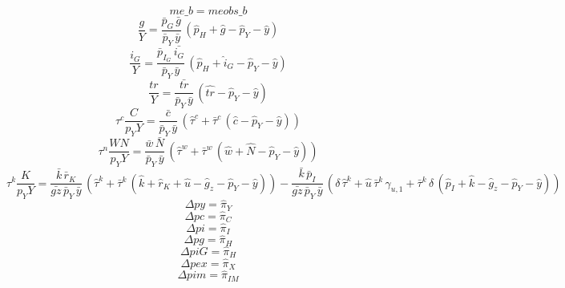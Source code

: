 \begin{dmath}
{me\_b}={meobs\_b}
\end{dmath}
\begin{dmath}
{\frac{g}{Y}}=\frac{{\bar{p}_G}\, {\bar{g}}}{{\bar{p}_Y}\, {\bar{y}}}\, \left({\hat{p}_H}+{\hat{g}}-{\hat{p}_Y}-{\hat{y}}\right)
\end{dmath}
\begin{dmath}
{\frac{{i}_G}{Y}}=\frac{{\bar{p}_{I_G}}\, {\bar{i_G}}}{{\bar{p}_Y}\, {\bar{y}}}\, \left({\hat{p}_H}+{\hat{i}_G}-{\hat{p}_Y}-{\hat{y}}\right)
\end{dmath}
\begin{dmath}
{\frac{tr}{Y}}=\frac{{\bar{tr}}}{{\bar{p}_Y}\, {\bar{y}}}\, \left({\hat{tr}}-{\hat{p}_Y}-{\hat{y}}\right)
\end{dmath}
\begin{dmath}
{{{\tau}^{c}}\frac{C}{{p_{Y}}Y}}=\frac{{\bar{c}}}{{\bar{p}_Y}\, {\bar{y}}}\, \left({\hat{\tau}^c}+{\bar{\tau}^c}\, \left({\hat{c}}-{\hat{p}_Y}-{\hat{y}}\right)\right)
\end{dmath}
\begin{dmath}
{{{\tau}^{n}}\frac{WN}{{p_{Y}}Y}}=\frac{{\bar{w}}\, {\bar{N}}}{{\bar{p}_Y}\, {\bar{y}}}\, \left({\hat{\tau}^w}+{\bar{\tau}^w}\, \left({\hat{w}}+{\hat{N}}-{\hat{p}_Y}-{\hat{y}}\right)\right)
\end{dmath}
\begin{dmath}
{{{\tau}^{k}}\frac{K}{{p_{Y}}Y}}=\frac{{\bar{k}}\, {\bar{r}_K}}{{\bar{gz}}\, {\bar{p}_Y}\, {\bar{y}}}\, \left({\hat{\tau}^k}+{\bar{\tau}^k}\, \left({\hat{k}}+{\hat{r}_K}+{\hat{u}}-{{\hat{g}_z}}-{\hat{p}_Y}-{\hat{y}}\right)\right)-\frac{{\bar{k}}\, {\bar{p}_I}}{{\bar{gz}}\, {\bar{p}_Y}\, {\bar{y}}}\, \left({\delta}\, {\hat{\tau}^k}+{\hat{u}}\, {\bar{\tau}^k}\, {\gamma_{u,1}}+{\bar{\tau}^k}\, {\delta}\, \left({\hat{p}_I}+{\hat{k}}-{{\hat{g}_z}}-{\hat{p}_Y}-{\hat{y}}\right)\right)
\end{dmath}
\begin{dmath}
{\Delta{py}}={\hat{\pi}_{Y}}
\end{dmath}
\begin{dmath}
{\Delta{pc}}={\hat{\pi}_{C}}
\end{dmath}
\begin{dmath}
{\Delta{pi}}={\hat{\pi}_{I}}
\end{dmath}
\begin{dmath}
{\Delta{pg}}={\hat{\pi}_{H}}
\end{dmath}
\begin{dmath}
{\Delta{piG}}={\hat{\pi}_{H}}
\end{dmath}
\begin{dmath}
{\Delta{pex}}={\hat{\pi}_{X}}
\end{dmath}
\begin{dmath}
{\Delta{pim}}={\hat{\pi}_{IM}}
\end{dmath}
